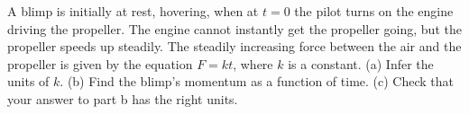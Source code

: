         A blimp is initially at rest, hovering, when at $t=0$ the
        pilot turns on the engine driving the propeller. The engine cannot
        instantly get the propeller going, but the propeller speeds
        up steadily. The steadily increasing force between the air
        and the propeller is given by the equation $F=kt$, where $k$ is
        a constant.
(a) Infer the units of $k$.
(b) Find the blimp's momentum as a function of time.\answercheck
(c) Check that your answer to part b has the right units.
